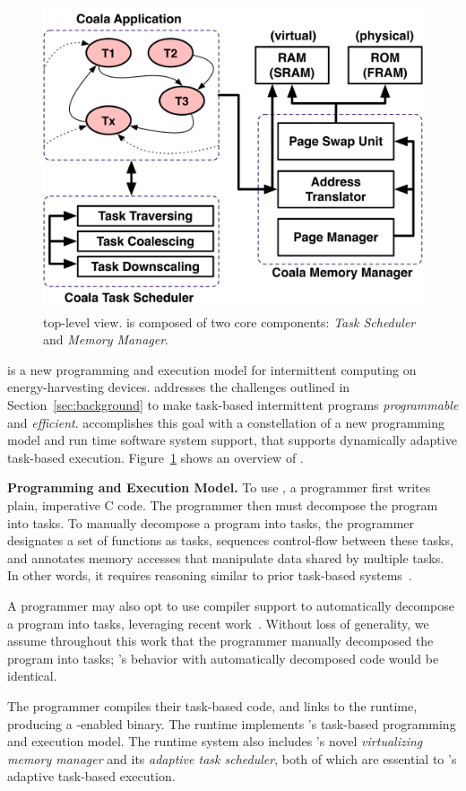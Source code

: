 \begin{figure}
	\centering
	\includegraphics[width=0.5\columnwidth]{figures/graffle/overview.pdf}
	\caption{\sys top-level view. \sys is composed of two core components: \emph{Task Scheduler} and \emph{Memory Manager}.}
	\label{fig:system_overview}
\end{figure}

\sys is a new programming and execution model for intermittent computing on energy-harvesting devices. \sys addresses the challenges outlined in Section~\ref{sec:background} to make task-based intermittent programs {\em programmable} and {\em efficient}. \sys accomplishes this goal with a constellation of a new programming model and run time software system support, that supports dynamically adaptive task-based execution. Figure~\ref{fig:system_overview} shows an overview of \sys.

\textbf{\sys Programming and Execution Model.}  To use \sys, a programmer first writes plain, imperative C code. The programmer then must decompose the program into tasks. To manually decompose a program into tasks, the programmer designates a set of functions as tasks, sequences control-flow between these tasks, and annotates memory accesses that manipulate data shared by multiple tasks. In other words, it requires reasoning similar to prior task-based systems~\cite{chain,alpaca}. 

A programmer may also opt to use compiler support to automatically decompose a program into tasks, leveraging recent work~\cite{cleancut_2018,baghsorkhi_cgo_2018}. Without loss of generality, we assume throughout this work that the programmer manually decomposed the program into tasks; \sys's behavior with automatically decomposed code would be identical.

The programmer compiles their task-based code, and links to the \sys runtime,
producing a \sys-enabled binary. The \sys runtime implements \sys's task-based
programming and execution model. The runtime system also includes \sys's novel
{\em virtualizing memory manager} and its {\em adaptive task scheduler}, both
of which are essential to \sys's adaptive task-based execution.

